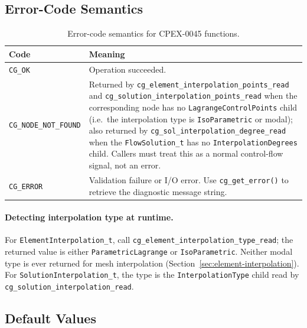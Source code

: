 \documentclass[11pt,letterpaper]{article}
\begin{document}
\subsection{Error-Code Semantics}

\begin{table}[htbp]
\centering
\small
{}
\begin{tabularx}{\linewidth}{@{} l >{\raggedright\arraybackslash}X @{}}
\toprule
\textbf{Code} & \textbf{Meaning} \\
\midrule
\texttt{CG\_OK}              & Operation succeeded. \\
\texttt{CG\_NODE\_NOT\_FOUND} & Returned by \texttt{cg\_element\_interpolation\_points\_read} and
  \texttt{cg\_solution\_interpolation\_points\_read} when the corresponding node has no
  \texttt{LagrangeControlPoints} child (i.e.\ the interpolation type is \texttt{IsoParametric}
  or modal); also returned by \texttt{cg\_sol\_interpolation\_degree\_read} when the
  \texttt{FlowSolution\_t} has no \texttt{InterpolationDegrees} child.  Callers must treat this
  as a normal control-flow signal, not an error. \\
\texttt{CG\_ERROR}           & Validation failure or I/O error.  Use \texttt{cg\_get\_error()}
  to retrieve the diagnostic message string. \\
\bottomrule
\end{tabularx}
\caption{Error-code semantics for CPEX-0045 functions.}
\end{table}

\paragraph{Detecting interpolation type at runtime.}
For \texttt{ElementInterpolation\_t}, call \texttt{cg\_element\_interpolation\_type\_read}; the
returned value is either \texttt{ParametricLagrange} or \texttt{IsoParametric}.  Neither modal
type is ever returned for mesh interpolation
(Section~\ref{sec:element-interpolation}).  For \texttt{SolutionInterpolation\_t}, the type is
the \texttt{InterpolationType} child read by \texttt{cg\_solution\_interpolation\_read}.

\subsection{Default Values}
\end{document}
